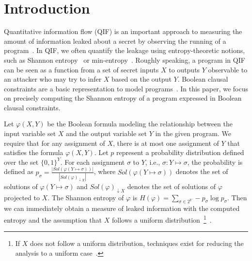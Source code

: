 \section{Introduction}
\label{sec:Intro}

Quantitative information flow (QIF) is an important approach to measuring the amount of information leaked about a secret by observing the running of a program~\cite{denning1982cryptography, gray1992toward}.
In QIF, we often quantify the leakage using entropy-theoretic notions, such as Shannon entropy~\cite{backes2009automatic, cerny2011complexity, phan2012symbolic, smith2009foundations} or
min-entropy~\cite{backes2009automatic, meng2011calculating, phan2012symbolic, smith2009foundations}.
Roughly speaking, a program in QIF can be seen as a function from a set of secret inputs $X$ to outputs $Y$ observable to an attacker who may try to infer $X$ based on the output $Y$.
Boolean clausal constraints are a basic representation to model programs~\cite{fremont2017maximum, golia2022scalable}. 
In this paper, we focus on precisely computing the Shannon entropy of a program expressed in Boolean clausal constraints.

Let $\varphi(X,Y)$ be the Boolean formula modeling the relationship between the input variable set $X$ and the output variable set $Y$ in the given program.
We require that for any assignment of $X$, there is at most one assignment of $Y$ that satisfies the formula  $\varphi(X,Y)$.
Let $p$ represent a probability distribution defined over the set $\{0,1\}^Y$.
For each assignment $\sigma$ to $Y$, i.e., $\sigma:Y \mapsto \sigma$, the probability is defined as $p_{\sigma} = \frac{\left| \mathit{Sol}(\varphi(Y \mapsto \sigma)) \right|}{ \left| \mathit{Sol}(\varphi)_{\downarrow X} \right| }$, where $\mathit{Sol}(\varphi(Y \mapsto \sigma))$ denotes the set of solutions of $\varphi(Y \mapsto \sigma)$ and $\mathit{Sol}(\varphi)_{\downarrow X}$ denotes the set of solutions of $\varphi$ projected to $X$.
The Shannon entropy of $\varphi$ is $H(\varphi) = \sum_{\sigma \in 2^Y} -p_{\sigma} \log p_{\sigma} $.
Then we can immediately obtain a measure of leaked information with the computed entropy and the assumption that $X$ follows a uniform distribution~\footnote{If $X$ does not follow a uniform distribution, techniques exist
for reducing the analysis to a uniform case~\cite{backes2011non}.}~\cite{klebanov2013sat}. 

